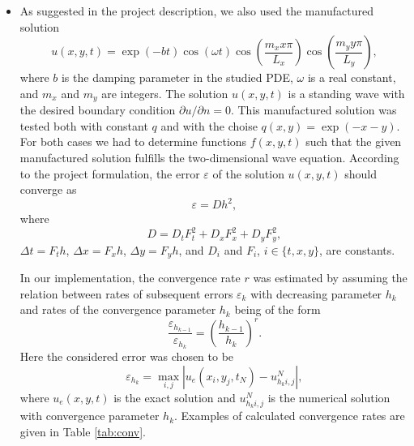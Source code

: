 \documentclass[twoside]{article}
\begin{document}
\begin{itemize}
\item As suggested in the project description, we also used the manufactured solution 
  \begin{equation}
    u(x, y, t) = \exp\left( -bt\right)\cos\left( \omega t\right)\cos\left( \frac{m_{x}x\pi }{L_{x}}\right)\cos\left( \frac{m_{y}y\pi }{L_{y}}\right),
  \end{equation}
where $b$ is the damping parameter in the studied PDE, $\omega $ is a real constant, and $m_{x}$ and $m_{y}$ are integers. The solution $u(x, y, t)$ is a standing wave with the desired boundary condition $\partial u/\partial n = 0$. This manufactured solution was tested both with constant $q$ and with the choise $q(x, y) = \exp(-x-y)$. For both cases we had to determine functions $f(x, y, t)$ such that the given manufactured solution fulfills the two-dimensional wave equation.
According to the project formulation, the error $\varepsilon $ of the solution $u(x, y, t)$ should converge as  
\begin{equation}
  \varepsilon = Dh^{2},
\end{equation}
where
\begin{equation}
  D = D_{t}F_{t}^{2}+D_{x}F_{x}^{2}+D_{y}F_{y}^{2},
\end{equation}
$\Delta t = F_{t}h $, $\Delta x = F_{x}h$, $\Delta y = F_{y}h$, and $D_{i}$ and $F_{i}$, $i \in \{ t, x, y \}$, are constants.

In our implementation, the convergence rate $r$ was estimated by assuming the relation between rates of subsequent errors $\varepsilon_{k}$ with decreasing parameter $h_{k}$ and rates of the convergence parameter $h_{k}$ being of the form
\begin{equation}
  \frac{\varepsilon_{h_{k-1}}}{\varepsilon_{h_{k}}} = \left(\frac{h_{k-1}}{h_{k}}\right)^{r}.
\end{equation}
Here the considered error was chosen to be 
\begin{equation}
  \varepsilon_{h_{k}} = \max_{i, j} \left|u_{e}(x_{i}, y_{j}, t_{N})-u_{h_{k} i,j}^{N}\right|,
\end{equation}
where $u_{e}(x, y, t)$ is the exact solution and $u_{h_{k} i,j}^{N}$ is the numerical solution with convergence parameter $h_{k}$. Examples of calculated convergence rates are given in Table \ref{tab:conv}.

\end{itemize}
\end{document}
